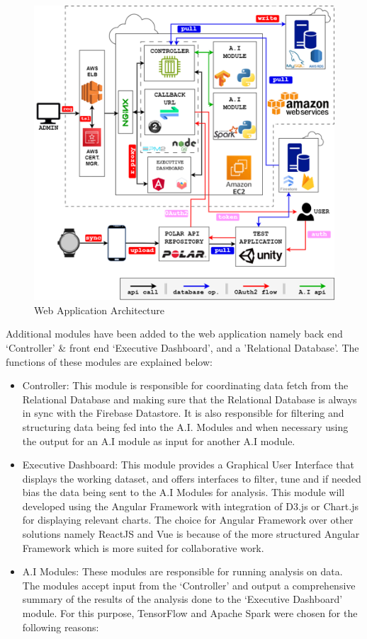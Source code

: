 \begin{figure}[h]
    \centering
    \includegraphics[scale=1]{images/new-arch.png}
    \caption{Web Application Architecture}
    \label{fig:proposed_web_architecture}
\end{figure}


Additional modules have been added to the web application namely back end `Controller' \& front end `Executive Dashboard', and a 'Relational Database'. The functions of these modules are explained below:

\begin{itemize}
\item {Controller}: This module is responsible for coordinating data fetch from the Relational Database and making sure that the Relational Database is always in sync with the Firebase Datastore. It is also responsible for filtering and structuring data being fed into the A.I. Modules and when necessary using the output for an A.I module as input for another A.I module. 
\item{Executive Dashboard}: This module provides a Graphical User Interface that displays the working dataset, and offers interfaces to filter, tune and if needed bias the data being sent to the A.I Modules for analysis. This module will developed using the Angular Framework with integration of D3.js or Chart.js for displaying relevant charts. The choice for Angular Framework over other solutions namely ReactJS and Vue is because of the more structured Angular Framework which is more suited for collaborative work.
\item{A.I Modules}: These modules are responsible for running analysis on data. The modules accept input from the `Controller' and output a comprehensive summary of the results of the analysis done to the `Executive Dashboard' module. For this purpose, TensorFlow and Apache Spark were chosen for the following reasons:
\end{itemize}

